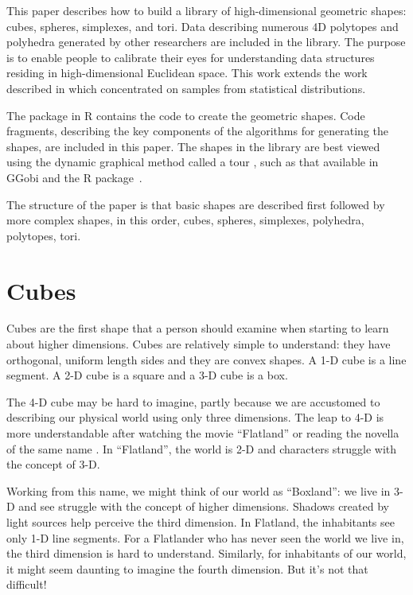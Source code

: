 This paper describes how to build a library of high-dimensional
geometric shapes: cubes, spheres, simplexes, and tori. Data
describing numerous 4D polytopes and polyhedra generated by other
researchers are included in the library. The purpose is to enable
people to calibrate their eyes for understanding data structures residing in
high-dimensional Euclidean space. This work extends the work described
in \cite{Co97} which concentrated on samples from statistical
distributions.

 The  package in R \citep{R03} contains
the code to create the geometric shapes. Code fragments, describing
the key components of the algorithms for generating the shapes, are
included in this paper. The shapes in the library are best viewed using the dynamic graphical method called a tour \citep{AS85,BCAH05,ClBW07}, such as that available in GGobi
\citep{STLBC02} and the  R package~\citep{WCHB11}. 

The structure of the paper is that basic shapes are described first
followed by more complex shapes, in this order,
cubes, spheres, simplexes, polyhedra, polytopes, tori.







\section{Cubes}


Cubes are the first shape that a person should examine when
starting to learn about higher dimensions. Cubes are relatively simple
to understand: they have orthogonal, uniform length sides and they are
convex shapes. A 1-D cube is a line segment. A 2-D cube is a square and
a 3-D cube is a box.

The 4-D cube may be hard to imagine, partly because we are accustomed
to describing our physical world using only three dimensions.  The
leap to 4-D is more understandable after watching the movie
``Flatland'' \citep{Ma65} or reading the novella of the same name
\citep{Ab1884}. In ``Flatland'', the world is 2-D and characters struggle
with the concept of 3-D.

Working from this name, we might think of our world as ``Boxland'': we live in 3-D and see
struggle with the concept of higher dimensions. Shadows created by light sources help
perceive the third dimension. In Flatland, the inhabitants see only
1-D line segments. For a Flatlander who has never seen the world we
live in, the third dimension is hard to understand. Similarly,
for inhabitants of our world, it might seem daunting to imagine the
fourth dimension. But it's not that difficult!

